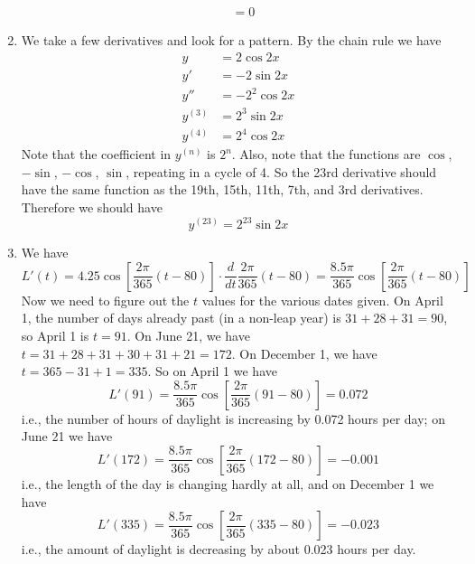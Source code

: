 \documentclass{article}
\begin{document}
\begin{enumerate}
\begin{align*}
             &= 0
  \end{align*}
\item %
  We take a few derivatives and look for a pattern.  By the chain rule
  we have
  \begin{align*}
    y &= 2\cos 2x \\
    y' &= -2\sin 2x \\
    y'' &= -2^2 \cos 2x \\
    y^{(3)} &= 2^3 \sin 2x \\
    y^{(4)} &= 2^4 \cos 2x
  \end{align*}
  Note that the coefficient in $y^{(n)}$ is $2^n$.  Also, note that
  the functions are $\cos$, $-\sin$, $-\cos$, $\sin$, repeating in a
  cycle of 4.  So the 23rd derivative should have the same function as
  the 19th, 15th, 11th, 7th, and 3rd derivatives.  Therefore we should
  have 
  \begin{equation*}
    y^{(23)} = 2^{23} \sin 2x
  \end{equation*}
\item %
  We have
  \begin{equation*}
    L'(t) = 4.25 \cos \left[ \frac{2\pi}{365} (t-80) \right] \cdot
    \frac{d}{dt} \frac{2\pi}{365} (t-80) = \frac{8.5\pi}{365} \cos
    \left[\frac{2\pi}{365} (t-80)\right]
  \end{equation*}
  Now we need to figure out the $t$ values for the various dates
  given.  On April 1, the number of days already past (in a non-leap
  year) is $31 + 28 + 31 = 90$, so April 1 is $t=91$.  On June 21, we
  have $t= 31 + 28 + 31 + 30 + 31 + 21 = 172$.  On December 1, we have 
  $t=365 - 31 + 1 = 335$.  So on April 1 we have
  \begin{equation*}
    L'(91) = \frac{8.5\pi}{365} \cos \left[ \frac{2\pi}{365}
      (91-80)\right] = 0.072
  \end{equation*}
  i.e., the number of hours of daylight is increasing by 0.072 hours
  per day; on June 21 we have 
  \begin{equation*}
    L'(172) = \frac{8.5\pi}{365} \cos \left[ \frac{2\pi}{365}
      (172-80)\right]
    = -0.001
  \end{equation*}
  i.e., the length of the day is changing hardly at all, and on
  December 1 we have
  \begin{equation*}
    L'(335) = \frac{8.5\pi}{365} \cos \left[ \frac{2\pi}{365}
      (335-80)\right]
    = -0.023
  \end{equation*}
  i.e., the amount of daylight is decreasing by about 0.023 hours per day.

\end{enumerate}
\end{document}
